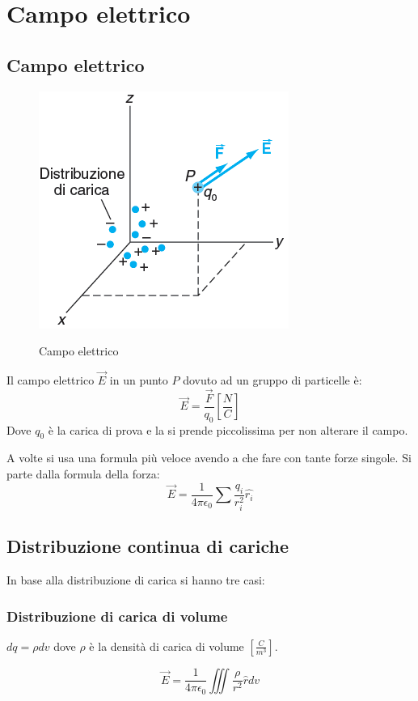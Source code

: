 \section{Campo elettrico}
\subsection{Campo elettrico}

\begin{figure}[h!]
    \centering
    \includegraphics[width=0.3\linewidth]{imgs/1 - campo.png}
    \label{fig:campo}
    \caption{Campo elettrico}
\end{figure}

Il campo elettrico $\vec{E}$ in un punto $P$ dovuto ad un gruppo di particelle è:
\begin{equation}
    \vec{E} = \frac{\vec{F}}{q_0} [\frac{N}{C}]
\end{equation}
Dove $q_0$ è la carica di prova e la si prende piccolissima per non alterare il campo.


A volte si usa una formula più veloce avendo a che fare con tante forze singole.
Si parte dalla formula della forza:
\begin{equation}
    \vec{E} = \frac{1}{4\pi \epsilon_0}\sum{\frac{q_i}{r_i^2}\hat{r_i}}   
\end{equation}

\subsection{Distribuzione continua di cariche}
In base alla distribuzione di carica si hanno tre casi:

\subsubsection{Distribuzione di carica di volume}
$dq = \rho dv$ dove $\rho$ è la densità di carica di volume $[\frac{C}{m^3}]$.

\begin{equation}
    \vec{E} = \frac{1}{4\pi \epsilon_0}\iiint{\frac{\rho}{r^2}\hat{r}dv}
\end{equation}
